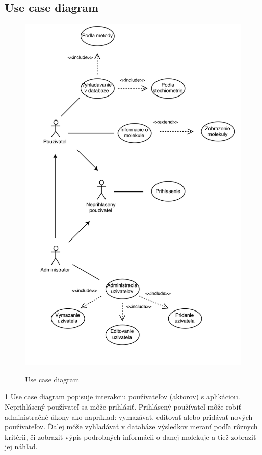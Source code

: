 \documentclass[12pt,a4paper]{article}
\begin{document}
\subsection{Use case diagram}
\begin{figure}[H]
	\caption{Use case diagram}
	\includegraphics[width=\textwidth]{use-case}
	\label{fig:use_case}
\end{figure}

\ref{fig:use_case}
Use case diagram popisuje interakciu používateľov (aktorov) s aplikáciou. Neprihlásený používateľ sa môže prihlásiť. Prihlásený používateľ môže robiť administračné úkony ako napríklad: vymazávať, editovať alebo pridávať nových používateľov. Ďalej môže vyhľadávať v databáze výsledkov meraní podľa rôznych kritérii, či zobraziť výpis podrobných informácii o danej molekuje a tiež zobraziť jej náhľad.
\end{document}

